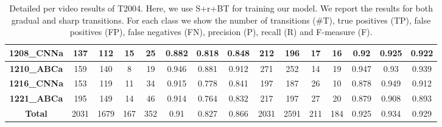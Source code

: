\documentclass[journal]{IEEEtran}
\begin{document}
\begin{table*}[h]
\begin{tabular}{|c|c|c|c|c|c|c|c|c|c|c|c|c|c|c|}
\textbf{1208\_CNNa} & 137           & 112         & 15          & 25          & 0.882      & 0.818      & 0.848      & 212           & 196         & 17          & 16          & 0.92       & 0.925      & 0.922      \\ \hline
\textbf{1210\_ABCa} & 159           & 140         & 8           & 19          & 0.946      & 0.881      & 0.912      & 271           & 252         & 14          & 19          & 0.947      & 0.93       & 0.939      \\ \hline
\textbf{1216\_CNNa} & 153           & 119         & 11          & 34          & 0.915      & 0.778      & 0.841      & 197           & 187         & 26          & 10          & 0.878      & 0.949      & 0.912      \\ \hline
\textbf{1221\_ABCa} & 195           & 149         & 14          & 46          & 0.914      & 0.764      & 0.832      & 217           & 197         & 27          & 20          & 0.879      & 0.908      & 0.893      \\ \hline
\textbf{Total}           & 2031          & 1679        & 167         & 352         & 0.91       & 0.827      & 0.866      & 2031          & 2591        & 211         & 184         & 0.925      & 0.934      & 0.929      \\ \hline
\end{tabular}
\caption{Detailed per video results of T2004. Here, we use S+r+BT for training our model. We report the results for both gradual and sharp transitions. For each class we show the number of transitions (\#T), true positives (TP), false positives (FP), false negatives (FN), precision (P), recall (R) and F-measure (F).}
\label{2004_07}
\end{table*}
\end{document}
